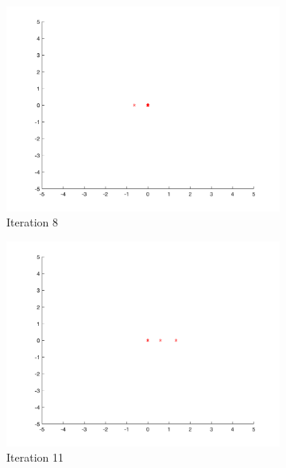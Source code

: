 \begin{figure}
\begin{subfigure}[b]{0.4\textwidth}
    \includegraphics[width=\textwidth]{img/smpl/circ/loa-iter-8}
    \caption{Iteration 8}
    \label{fig:s1-iter-2}
  \end{subfigure}
  \begin{subfigure}[b]{0.4\textwidth}
    \includegraphics[width=\textwidth]{img/smpl/circ/loa-iter-11}
    \caption{Iteration 11}
    \label{fig:s1-iter-3}
  \end{subfigure}
  \begin{subfigure}[b]{0.4\textwidth}

\end{subfigure}
\end{figure}
